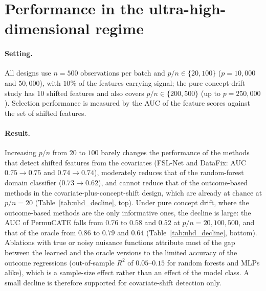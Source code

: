 
\section{Performance in the ultra-high-dimensional regime}
\label{app:uhd}

\paragraph{Setting.}
All designs use $n=500$ observations per batch and $p/n\in\{20,100\}$ ($p=10{,}000$ and $50{,}000$), with $10\%$ of the features carrying signal; the pure concept-drift study has $10$ shifted features and also covers $p/n\in\{200,500\}$ (up to $p=250{,}000$). Selection performance is measured by the AUC of the feature scores against the set of shifted features.

\paragraph{Result.}
Increasing $p/n$ from $20$ to $100$ barely changes the performance of the methods that detect shifted features from the covariates (FSL-Net and DataFix: AUC $0.75\to0.75$ and $0.74\to0.74$), moderately reduces that of the random-forest domain classifier ($0.73\to0.62$), and cannot reduce that of the outcome-based methods in the covariate-plus-concept-shift design, which are already at chance at $p/n=20$ (Table~\ref{tab:uhd_decline}, top). Under pure concept drift, where the outcome-based methods are the only informative ones, the decline is large: the AUC of PermuCATE falls from $0.76$ to $0.58$ and $0.52$ at $p/n=20,100,500$, and that of the oracle from $0.86$ to $0.79$ and $0.64$ (Table~\ref{tab:uhd_decline}, bottom). Ablations with true or noisy nuisance functions attribute most of the gap between the learned and the oracle versions to the limited accuracy of the outcome regressions (out-of-sample $R^2$ of $0.05$--$0.15$ for random forests and MLPs alike), which is a sample-size effect rather than an effect of the model class. A small decline is therefore supported for covariate-shift detection only.

